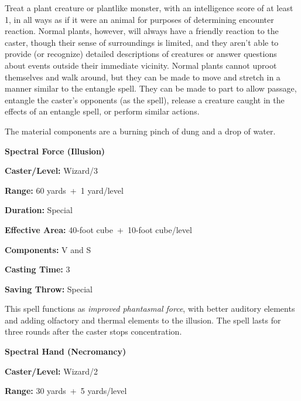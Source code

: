 \begin{multicols}{2}
Treat a plant creature or plantlike monster, with an intelligence score of at least 1, in all ways as if it were an animal for purposes of determining encounter reaction.  Normal plants, however, will always have a friendly reaction to the caster, though their sense of surroundings is limited, and they aren't able to provide (or recognize) detailed descriptions of creatures or answer questions about events outside their immediate vicinity.  Normal plants cannot uproot themselves and walk around, but they can be made to move and stretch in a manner similar to the entangle spell.  They can be made to part to allow passage, entangle the caster's opponents (as the spell), release a creature caught in the effects of an entangle spell, or perform similar actions.  

The material components are a burning pinch of dung and a drop of water.

\vspace{1em}

\noindent
\begin{minipage}{\columnwidth}

\noindent \textbf{Spectral Force (Illusion)}

\noindent \textbf{Caster/Level:} Wizard/3

\noindent \textbf{Range:} 60 yards~+~1 yard/level

\noindent \textbf{Duration:} Special 

\noindent \textbf{Effective Area:} 40-foot cube~+~10-foot cube/level

\noindent \textbf{Components:} V and S

\noindent \textbf{Casting Time:} 3

\noindent \textbf{Saving Throw:} Special

\end{minipage}

This spell functions as \textit{improved phantasmal force}, with better auditory elements and adding olfactory and thermal elements to the illusion.  The spell lasts for three rounds after the caster stops concentration.

\vspace{1em}

\noindent
\begin{minipage}{\columnwidth}

\noindent \textbf{Spectral Hand (Necromancy)}

\noindent \textbf{Caster/Level:} Wizard/2

\noindent \textbf{Range:} 30 yards~+~5 yards/level


\end{minipage}
\end{multicols}
